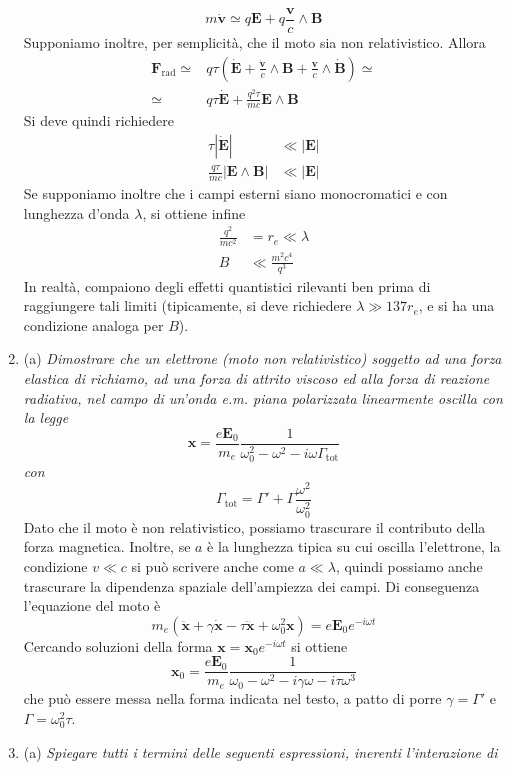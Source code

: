 \documentclass{article}
\renewcommand{\a}{(a)}
\renewcommand{\t}[1]{\textit{ #1}}
\renewcommand{\vec}[1]{\mathbf{#1}}
\begin{document}
\begin{enumerate}
	\[m\dot{\vec{v}}\simeq q\vec{E}+q\frac{\vec{v}}{c}\wedge\vec{B}\]
	Supponiamo inoltre, per semplicità, che il moto sia non relativistico. Allora
	\begin{align*}
		\vec{F}_\textrm{rad}\simeq&q\tau\left(\dot{\vec{E}}+\frac{\dot{\vec{v}}}{c}\wedge\vec{B}+\frac{\vec{v}}{c}\wedge\dot{\vec{B}}\right)\simeq\\\simeq&q\tau\dot{\vec{E}}+\frac{q^2\tau}{mc}\vec{E}\wedge\vec{B}
	\end{align*}
	Si deve quindi richiedere
	\begin{align*}
		\tau|\dot{\vec{E}}|&\ll|\vec{E}|\\\frac{q\tau}{mc}|\vec{E}\wedge\vec{B}|&\ll|\vec{E}|
	\end{align*}
	Se supponiamo inoltre che i campi esterni siano monocromatici e con lunghezza d'onda $\lambda$, si ottiene infine
	\begin{align*}
		\frac{q^2}{mc^2}&=r_e\ll\lambda\\ B&\ll\frac{m^2c^4}{q^3}
	\end{align*}
	In realtà, compaiono degli effetti quantistici rilevanti ben prima di raggiungere tali limiti (tipicamente, si deve richiedere $\lambda\gg137r_e$, e si ha una condizione analoga per $B$).
	\item\a\t{Dimostrare che un elettrone (moto non relativistico) soggetto ad una forza elastica
		di richiamo, ad una forza di attrito viscoso ed alla forza di reazione radiativa, nel
		campo di un’onda e.m. piana polarizzata linearmente oscilla con la legge
		\[\vec{x}=\frac{e\vec{E}_0}{m_e}\frac{1}{\omega_0^2-\omega^2-i\omega\Gamma_\mathrm{tot}}\]
		con
		\[\Gamma_\mathrm{tot}=\Gamma'+\Gamma\frac{\omega^2}{\omega_0^2}\]} Dato che il moto è non relativistico, possiamo trascurare il contributo della forza magnetica. Inoltre, se $a$ è la lunghezza tipica su cui oscilla l'elettrone, la condizione $v\ll c$ si può scrivere anche come $a\ll \lambda$, quindi possiamo anche trascurare la dipendenza spaziale dell'ampiezza dei campi. Di conseguenza l'equazione del moto è
	\[m_e(\ddot{\vec{x}}+\gamma\dot{\vec{x}}-\tau\dddot{\vec{x}}+\omega_0^2\vec{x})=e\vec{E}_0e^{-i\omega t}\]
	Cercando soluzioni della forma $\vec{x}=\vec{x}_0e^{-i\omega t}$ si ottiene
	\[\vec{x}_0=\frac{e\vec{E}_0}{m_e}\frac{1}{\omega_0-\omega^2-i\gamma\omega-i\tau\omega^3}\]
	che può essere messa nella forma indicata nel testo, a patto di porre $\gamma=\Gamma'$ e $\Gamma=\omega_0^2\tau$.
	\item\a\t{Spiegare tutti i termini delle seguenti espressioni, inerenti l'interazione di
}
\end{enumerate}
\end{document}
